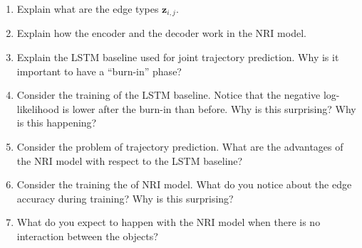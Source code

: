 \documentclass{article}
\begin{document}
\begin{enumerate}
	\item Explain what are the edge types $\mathbf{z}_{i,j}$.
	\item Explain how the encoder and the decoder work in the NRI model.
	\item Explain the LSTM baseline used for joint trajectory prediction. Why is it important to have a ``burn-in'' phase?
	\item Consider the training of the LSTM baseline. Notice that the negative log-likelihood is lower after the burn-in than before. Why is this surprising? Why is this happening?
	\item Consider the problem of trajectory prediction. What are the advantages of the NRI model with respect to the LSTM baseline? 
	\item Consider the training the of NRI model. What do you notice about the edge accuracy during training? Why is this surprising? 
	\item What do you expect to happen with the NRI model when there is no interaction between the objects?
\end{enumerate}
\end{document}

